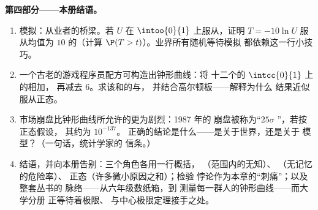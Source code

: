 \begin{problem}
\medskip
\noindent\textbf{第四部分——本册结语。}
\begin{enumerate}[resume]
  \item 模拟：从业者的桥梁。若 $U$ 在
        $\intoo{0}{1}$ 上服从，证明
        $T = -10\ln U$ 服从均值为 $10$ 的（计算
        $\P(T > t)$）。业界所有随机等待模拟
        都依赖这一行小技巧。
  \item 一个古老的游戏程序员配方可构造出钟形曲线：将
        十二个的 $\intcc{0}{1}$ 上的相加，
        再减去 $6$。求该和的与，
        并结合高尔顿板——解释为什么
        结果近似服从正态。
  \item 市场崩盘比钟形曲线所允许的更为剧烈：1987 年的
        崩盘被称为“$25\sigma$ ”，若按正态假设，
        其约为 $10^{-137}$。
        正确的结论是什么——是关于世界，还是关于
        模型？（一句话，统计学家的
        信条。）
  \item 结语，并向本册告别：三个角色各用一行概括，
        （范围内的无知）、
        （无记忆的危险率）、
        正态（许多微小原因之和）；检验
        悖论作为本章的“刺痛”；以及整套丛书的
        脉络——从六年级数纸箱，到
        测量每一群人的钟形曲线——而大学分册
        正等待着极限、
        与中心极限定理接手之处。
\end{enumerate}
\end{problem}
